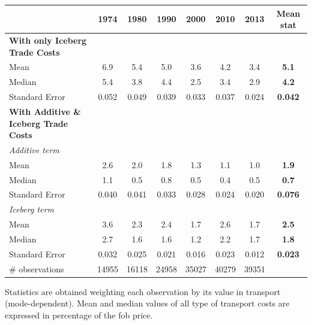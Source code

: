 \documentclass[a4paper,11pt]{article}
\begin{document}
\begin{table}[htbp]
\begin{center}
\begin{tabular}{lccccccc}
          & 1974  & 1980  & 1990  & 2000  & 2010  & 2013  & \multicolumn{1}{c}{\textbf{Mean stat}} \\
 \hline
\multicolumn{1}{l}{\textbf{With only Iceberg Trade Costs}} &       &       &       &       &       &       & \multicolumn{1}{c}{\textbf{}} \\
Mean  & 6.9 & 5.4 & 5.0 & 3.6 & 4.2 & 3.4 & \multicolumn{1}{c}{\textbf{5.1}} \\
Median & 5.4 & 3.8 & 4.4 & 2.5 & 3.4 & 2.9 & \multicolumn{1}{c}{\textbf{4.2}} \\
Standard Error & 0.052 & 0.049 & 0.039 & 0.033 & 0.037 & 0.024 & \multicolumn{1}{c}{\textbf{0.042}}\\
\hline
\multicolumn{1}{l}{\textbf{With Additive \& Iceberg Trade Costs }} &       &       &       &       &       &       & \multicolumn{1}{c}{\textbf{}}\\
\multicolumn{1}{l}{\textit{Additive term }} &       &       &       &       &       &       & \multicolumn{1}{c}{\textbf{}} \\
\multicolumn{1}{l}{Mean } & 2.6 & 2.0 & 1.8 & 1.3 & 1.1 & 1.0 & \multicolumn{1}{c}{\textbf{1.9}} \\
\multicolumn{1}{l}{Median} & 1.1 & 0.5 & 0.8 & 0.5 & 0.4 & 0.5 & \multicolumn{1}{c}{\textbf{0.7}} \\
\multicolumn{1}{l}{Standard Error} & 0.040 & 0.041 & 0.033 & 0.028 & 0.024 & 0.020 & \multicolumn{1}{c}{\textbf{0.076}} \\
\multicolumn{1}{l}{\textit{Iceberg term}} &       &       &       &       &       &       & \multicolumn{1}{c}{\textbf{}} \\
\multicolumn{1}{l}{Mean } & 3.6 & 2.3 & 2.4 & 1.7 & 2.6 & 1.7 & \multicolumn{1}{c}{\textbf{2.5}} \\
\multicolumn{1}{l}{Median} & 2.7 & 1.6 & 1.6 & 1.2 & 2.2 & 1.7 & \multicolumn{1}{c}{\textbf{1.8}} \\
Standard Error & 0.032 & 0.025 & 0.021 & 0.016 & 0.023 & 0.012 & \multicolumn{1}{c}{\textbf{0.023}} \\
\hline
\# observations & 14955 & 16118 & 24958 & 35027 & 40279 & 39351 & \textbf{} \\
\hline\hline
    \end{tabular}%
  \end{center}
  \label{tab:result_air}%
\tiny{Statistics are obtained weighting each observation by its value in transport (mode-dependent). Mean and median values of all type of transport costs are expressed in percentage of the fob price. }
\end{table}%
\end{document}
